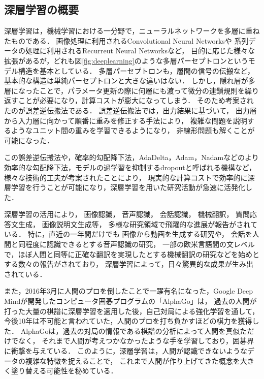 \subsection{深層学習の概要}
深層学習は，機械学習における一分野で，ニューラルネットワークを多層に重ねたものである．
画像処理に利用されるConvolutional Neural Networks\cite{lecun1998gradient}や
系列データの処理に利用されるRecurreut Neural Networks\cite{williams1989learning}など，
目的に応じた様々な拡張があるが，どれも図\ref{fig:deeplearning}のような多層パーセプトロンというモデル構造を基本としている．
多層パーセプトロンも，層間の信号の伝搬など，基本的な構造は単純パーセプトロンと大きな違いはない．
しかし，隠れ層が多層になったことで，パラメータ更新の際に何層にも渡って微分の連鎖規則を繰り返すことが必要になり，計算コストが膨大になってしまう．
そのため考案されたのが誤差逆伝搬法\cite{rumelhart1988learning}である．
誤差逆伝搬法では，出力結果に基づいて，
出力層から入力層に向かって順番に重みを修正する手法により，
複雑な問題を説明するようなユニット間の重みを学習できるようになり，
非線形問題も解くことが可能になった．

この誤差逆伝搬法や，確率的勾配降下法\cite{robbins1951stochastic,kushner2003stochastic}，AdaDelta\cite{zeiler2012adadelta}，Adam\cite{kingma2014adam}，Nadam\cite{dozat2015incorporating}などのより効率的な勾配降下法，モデルの過学習を抑制するdropout\cite{srivastava2014dropout}と呼ばれる機構など，
様々な技術的工夫が考案されたことにより，
現実的な計算コストで効率的に深層学習を行うことが可能になり，深層学習を用いた研究活動が急速に活発化した．


深層学習の活用により，
画像認識\cite{schroff2015facenet,szegedy2014going}，
音声認識\cite{hinton2012deep, bahdanau2015end}，
会話認識\cite{sak2015fast}，
機械翻訳\cite{sutskever2014sequence, dong2015multi}，
質問応答文生成\cite{yin2015neural}，
画像説明文生成\cite{xu2015show,vinyals2014show}等，
多様な研究領域で飛躍的な進展が報告がされている．
特に，直近の一年間だけでも
画像から動画を生成する研究\cite{vondrick2016generating}や，
会話を人間と同程度に認識できるとする音声認識の研究\cite{xiong2016achieving}，
一部の欧米言語間の文レベルで，ほぼ人間と同等に正確な翻訳を実現したとする機械翻訳の研究\cite{wu2016google}などを始めとする数々の報告がされており，
深層学習によって，日々驚異的な成果が生み出されている．

また，2016年3月に人間のプロを倒したことで一躍有名になった，Google Deep Mindが開発したコンピュータ囲碁プログラムの「AlphaGo」\cite{silver2016mastering}は，
過去の人間が打った大量の棋譜に深層学習を適用した後，自己対局による強化学習を通して，
今後10年は不可能と言われていた，人間のプロを打ち負かすほどの棋力を獲得した．
AlphaGoは，過去の対局の情報である棋譜の分析によって人間を真似ただけでなく，
それまで人間が考えつかなかったような手を学習しており，囲碁界に衝撃を与えている．
このように，深層学習は，人間が認識できないようなデータの複雑な特徴を捉えることで，
これまで人間が作り上げてきた概念を大きく塗り替える可能性を秘めている．


